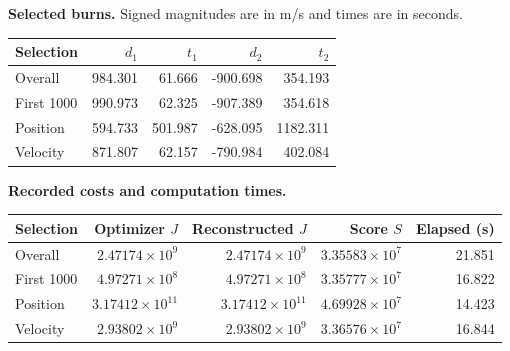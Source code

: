 \par\noindent\textbf{Selected burns.} Signed magnitudes are in m/s and times are in seconds.
\begin{center}
\begin{tabular}{lrrrr}
\toprule
Selection & $d_1$ & $t_1$ & $d_2$ & $t_2$\\
\midrule
Overall & 984.301 & 61.666 & -900.698 & 354.193\\
First 1000 & 990.973 & 62.325 & -907.389 & 354.618\\
Position & 594.733 & 501.987 & -628.095 & 1182.311\\
Velocity & 871.807 & 62.157 & -790.984 & 402.084\\
\bottomrule
\end{tabular}
\end{center}
\par\noindent\textbf{Recorded costs and computation times.}
\begin{center}
\begin{tabular}{lrrrr}
\toprule
Selection & Optimizer $J$ & Reconstructed $J$ & Score $S$ & Elapsed (s)\\
\midrule
Overall & $2.47174\times10^{9}$ & $2.47174\times10^{9}$ & $3.35583\times10^{7}$ & 21.851\\
First 1000 & $4.97271\times10^{8}$ & $4.97271\times10^{8}$ & $3.35777\times10^{7}$ & 16.822\\
Position & $3.17412\times10^{11}$ & $3.17412\times10^{11}$ & $4.69928\times10^{7}$ & 14.423\\
Velocity & $2.93802\times10^{9}$ & $2.93802\times10^{9}$ & $3.36576\times10^{7}$ & 16.844\\
\bottomrule
\end{tabular}
\end{center}
\clearpage
